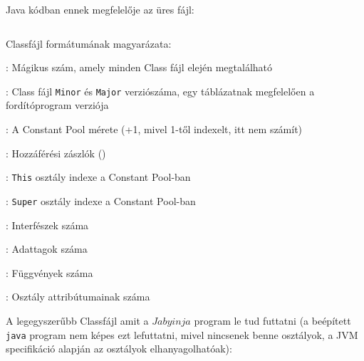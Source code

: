 Java kódban ennek megfelelője az üres fájl:
\begin{verbatim}
\end{verbatim}

Classfájl formátumának magyarázata:

\begin{compactitem}
\setlength\itemsep{-5px}
\item {}: Mágikus szám, amely minden Class fájl elején megtalálható
\item {} : Class fájl \lstinline{Minor} és \lstinline{Major} verziószáma, egy táblázatnak megfelelően a fordítóprogram verziója
\item {}: A Constant Pool mérete (+1, mivel 1-től indexelt, itt nem számít)
\item {}: Hozzáférési zászlók ()
\item {}: \lstinline{This} osztály indexe a Constant Pool-ban
\item {}: \lstinline{Super} osztály indexe a Constant Pool-ban
\item {}: Interfészek száma
\item {}: Adattagok száma
\item {}: Függvények száma
\item {}: Osztály attribútumainak száma
\end{compactitem}

\pagebreak

A legegyszerűbb Classfájl amit a $Jabyinja$ program le tud futtatni (a beépített \lstinline{java} program nem képes ezt lefuttatni, mivel nincsenek benne osztályok, a JVM specifikáció alapján az osztályok elhanyagolhatóak):

